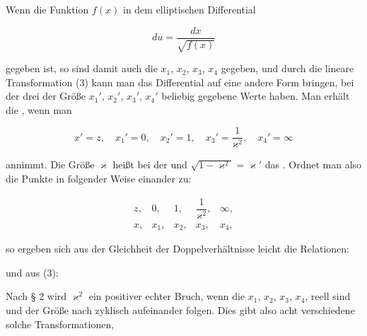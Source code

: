 

Wenn die Funktion $f(x)$ in dem elliptischen Differential

\[
du = \dfrac{dx}{\sqrt{f(x)}}
\]

gegeben ist, so sind damit auch die $x_1$, $x_2$, $x_3$, $x_4$ gegeben, und durch die lineare Transformation (3) kann man das Differential auf eine andere Form bringen, bei der drei der Größe $x_1'$, $x_2'$, $x_3'$, $x_4'$ beliebig gegebene Werte haben. %
Man erhält die , wenn man

\[
x' = z, \quad x_1' = 0, \quad x_2' = 1, \quad x_3' = \dfrac{1}{\varkappa^2}, \quad x_4' = \infty
\]

annimmt. Die Größe $\varkappa$ heißt bei  der  und $\sqrt{1-\varkappa^2} = \varkappa'$ das . Ordnet man also die Punkte in folgender Weise einander zu:

\[
\begin{array}{ccccc}
z, & 0, & 1, & \dfrac{1}{\varkappa^2}, & \infty, \\[6pt]
x, & x_1, & x_2, & x_3, & x_4,
\end{array}
\]

so ergeben sich aus der Gleichheit der Doppelverhältnisse leicht die Relationen:




und aus (3):


Nach § 2 wird $\varkappa^2$ ein positiver echter Bruch, wenn die $x_1$, $x_2$, $x_3$, $x_4$, reell sind und der Größe nach zyklisch aufeinander folgen. Dies gibt also acht verschiedene solche Transformationen,

